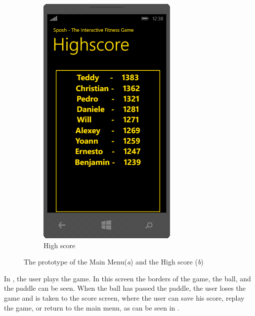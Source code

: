 \begin{figure}[H]
\begin{subfigure}[b]{0.3\textwidth}
	\includegraphics[scale = 0.55]{media/prototype/highscore.png}
	\caption{High score}
	\label{figure:highscore}
	\end{subfigure}
	\caption{The prototype of the Main Menu(\textit{a}) and the High score (\textit{b})}
\end{figure}
In , the user plays the game. 
In this screen the borders of the game, the ball, and the paddle can be seen.
When the ball has passed the paddle, the user loses the game and is taken to the score screen, where the user can save his score, replay the game, or return to the main menu, as can be seen in .

